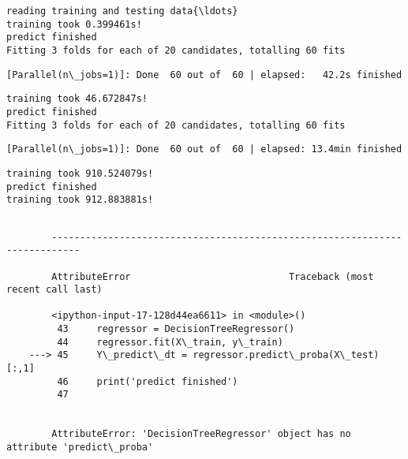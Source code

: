 \documentclass[11pt]{article}
\begin{document}
    \begin{Verbatim}[commandchars=\\\{\}]
reading training and testing data{\ldots}
training took 0.399461s!
predict finished
Fitting 3 folds for each of 20 candidates, totalling 60 fits

    \end{Verbatim}

    \begin{Verbatim}[commandchars=\\\{\}]
[Parallel(n\_jobs=1)]: Done  60 out of  60 | elapsed:   42.2s finished

    \end{Verbatim}

    \begin{Verbatim}[commandchars=\\\{\}]
training took 46.672847s!
predict finished
Fitting 3 folds for each of 20 candidates, totalling 60 fits

    \end{Verbatim}

    \begin{Verbatim}[commandchars=\\\{\}]
[Parallel(n\_jobs=1)]: Done  60 out of  60 | elapsed: 13.4min finished

    \end{Verbatim}

    \begin{Verbatim}[commandchars=\\\{\}]
training took 910.524079s!
predict finished
training took 912.883881s!

    \end{Verbatim}

    \begin{Verbatim}[commandchars=\\\{\}]

        ---------------------------------------------------------------------------

        AttributeError                            Traceback (most recent call last)

        <ipython-input-17-128d44ea6611> in <module>()
         43     regressor = DecisionTreeRegressor()
         44     regressor.fit(X\_train, y\_train)
    ---> 45     Y\_predict\_dt = regressor.predict\_proba(X\_test)[:,1]
         46     print('predict finished')
         47 


        AttributeError: 'DecisionTreeRegressor' object has no attribute 'predict\_proba'

    \end{Verbatim}
\end{document}
